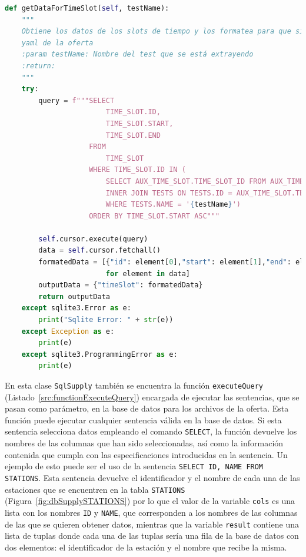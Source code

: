 \begin{lstlisting}[language=Python,
                   style=python,
                   frame=none,
                   numbers=none,
                   basicstyle=\ttfamily\normalsize,
                   caption={Función \texttt{getDataForTimeSlot}},
                   label=src:functionGetDataForTimeSlot,
                   inputencoding=utf8]                   
def getDataForTimeSlot(self, testName):
    """
    Obtiene los datos de los slots de tiempo y los formatea para que sigan la estructra de timeSlot dentro del archivo
    yaml de la oferta
    :param testName: Nombre del test que se está extrayendo
    :return:
    """
    try:
        query = f"""SELECT 
                        TIME_SLOT.ID,
                        TIME_SLOT.START,
                        TIME_SLOT.END                            
                    FROM 
                        TIME_SLOT
                    WHERE TIME_SLOT.ID IN (
                        SELECT AUX_TIME_SLOT.TIME_SLOT_ID FROM AUX_TIME_SLOT
                        INNER JOIN TESTS ON TESTS.ID = AUX_TIME_SLOT.TEST_ID
                        WHERE TESTS.NAME = '{testName}')
                    ORDER BY TIME_SLOT.START ASC"""

        self.cursor.execute(query)
        data = self.cursor.fetchall()
        formatedData = [{"id": element[0],"start": element[1],"end": element[2]}
                        for element in data]
        outputData = {"timeSlot": formatedData}
        return outputData
    except sqlite3.Error as e:
        print("Sqlite Error: " + str(e))
    except Exception as e:
        print(e)
    except sqlite3.ProgrammingError as e:
        print(e)
\end{lstlisting}

En esta clase \texttt{SqlSupply} también se encuentra la función \texttt{executeQuery} (Listado~\ref{src:functionExecuteQuery}) encargada de ejecutar las sentencias, que se pasan como parámetro, en la base de datos para los archivos de la oferta. Esta función puede ejecutar cualquier sentencia válida en la base de datos. Si esta sentencia selecciona datos empleando el comando \texttt{SELECT}, la función devuelve los nombres de las columnas que han sido seleccionadas, así como la información contenida que cumpla con las especificaciones introducidas en la sentencia. Un ejemplo de esto puede ser el uso de la sentencia \texttt{SELECT ID, NAME FROM STATIONS}. Esta sentencia devuelve el identificador y el nombre de cada una de las estaciones que se encuentren en la tabla \texttt{STATIONS} (Figura~\ref{fig:dbSupplySTATIONS}) por lo que el valor de la variable \texttt{cols} es una lista con los nombres \texttt{ID} y \texttt{NAME}, que corresponden a los nombres de las columnas de las que se quieren obtener datos, mientras que la variable \texttt{result} contiene una lista de tuplas donde cada una de las tuplas sería una fila de la base de datos con dos elementos: el identificador de la estación y el nombre que recibe la misma.

